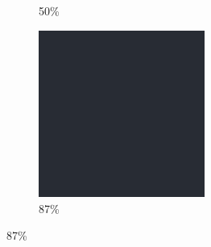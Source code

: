 \documentclass[12pt, fleqn]{report}                             %
\theoremstyle{break}                                            %
\begin{document}
\begin{figure}[ht!]
\begin{subfigure}[b]{0.4\linewidth}
          \caption{50\%}
        \end{subfigure}
        \begin{subfigure}[b]{0.4\linewidth}
          \includegraphics[width=0.6\textwidth]{Images/0/d.png}
          \caption{87\%}
        \end{subfigure}
      \end{figure}
\end{document}
